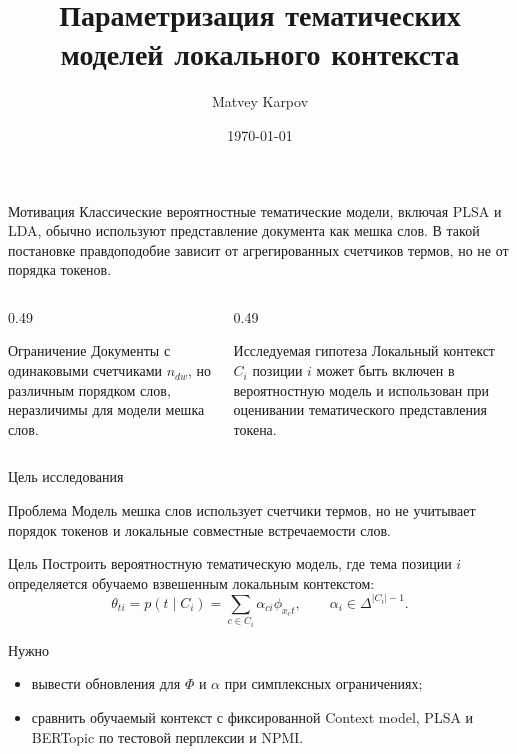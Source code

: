 \documentclass[aspectratio=169]{beamer}
\title{Параметризация тематических моделей локального контекста}
\author{Matvey Karpov}
\institute{
    Intelligent Systems Department, MIPT
}
\date{\today}
\newcommand{\contextmodel}{Context model}
\newcommand{\plsa}{PLSA}
\newcommand{\bertopic}{BERTopic}
\begin{document}

\begin{frame}
    \thispagestyle{empty}
    \maketitle
\end{frame}

\begin{frame}{Мотивация}
    Классические вероятностные тематические модели, включая \plsa{} и LDA,
    обычно используют представление документа как мешка слов. В такой
    постановке правдоподобие зависит от агрегированных счетчиков термов, но не
    от порядка токенов.

    \begin{columns}[T]
        \begin{column}{0.49\textwidth}
            \begin{block}{Ограничение}
                Документы с одинаковыми счетчиками \(n_{dw}\), но различным
                порядком слов, неразличимы для модели мешка слов.
            \end{block}
        \end{column}
        \begin{column}{0.49\textwidth}
            \begin{block}{Исследуемая гипотеза}
                Локальный контекст \(C_i\) позиции \(i\) может быть включен в
                вероятностную модель и использован при оценивании
                тематического представления токена.
            \end{block}
        \end{column}
    \end{columns}
\end{frame}

\begin{frame}{Цель исследования}
    \small
    \begin{block}{Проблема}
        Модель мешка слов использует счетчики термов, но не учитывает порядок
        токенов и локальные совместные встречаемости слов.
    \end{block}

    \begin{block}{Цель}
        Построить вероятностную тематическую модель, где тема позиции \(i\)
        определяется обучаемо взвешенным локальным контекстом:
        \[
            \theta_{ti}=p(t\mid C_i)
            =\sum_{c\in C_i}\alpha_{ci}\phi_{x_c t},
            \qquad \alpha_i\in\Delta^{|C_i|-1}.
        \]
    \end{block}

    \begin{block}{Нужно}
        \begin{itemize}
            \item вывести обновления для \(\Phi\) и \(\alpha\) при симплексных ограничениях;
            \item сравнить обучаемый контекст с фиксированной \contextmodel{},
            \plsa{} и \bertopic{} по тестовой перплексии и NPMI.
        \end{itemize}
    \end{block}
\end{frame}
\end{document}
